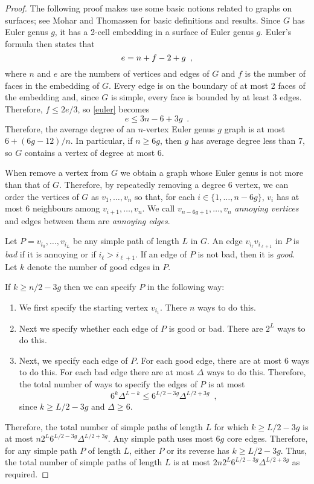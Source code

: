 \documentclass[lotsofwhite]{patmorin}
\begin{document}
\begin{proof}
   The following proof makes use some basic notions related to graphs
   on surfaces; see Mohar and Thomassen \cite{mohar.thomassen} for basic
   definitions and results.
   Since $G$ has Euler genus $g$, it has a 2-cell embedding in a surface
   of Euler genus $g$.  Euler's formula then states that 
   \begin{equation}
      e = n+f-2+g \enspace ,  \eqlabel{euler}
   \end{equation}
   where $n$ and $e$ are the numbers of vertices and edges of
   $G$ and $f$ is the number of faces in the embedding of $G$.  
   Every edge is on the boundary of at most 2 faces of the embedding
   and, since $G$ is simple, 
   every face is
   bounded by at least 3 edges.  Therefore, $f \le 2e/3$, so \eqref{euler}
   becomes
   \[
       e\le 3n-6+3g \enspace .
   \]
   Therefore, the average degree of an $n$-vertex Euler genus $g$ graph
   is at most $6+(6g-12)/n$.  In particular, if $n \ge 6g$, then $g$
   has average degree less than 7, so $G$ contains a vertex of degree
   at most $6$.
  
   When remove a vertex from $G$ we obtain a graph whose Euler genus is
   not more than that of $G$.  Therefore, by repeatedly removing a degree
   6 vertex, we can order the vertices of $G$ as $v_1,\ldots,v_n$ so that,
   for each $i\in\{1,\ldots,n-6g\}$, $v_i$ has at most 6 neighbours among
   $v_{i+1},\ldots,v_n$.  We call $v_{n-6g+1},\ldots,v_n$ \emph{annoying
   vertices} and edges between them are \emph{annoying edges}.

   Let $P=v_{i_0},\ldots,v_{i_L}$ be any simple path of length $L$
   in $G$.  An edge $v_{i_\ell}v_{i_{\ell+1}}$ in $P$ is \emph{bad}
   if it is annoying or if $i_{\ell}>i_{\ell+1}$. If an edge of $P$
   is not bad, then it is \emph{good}.  Let $k$ denote the number of
   good edges in $P$.

   If $k\ge n/2-3g$ then we can specify $P$ in the following way:
   \begin{enumerate}
     \item We first specify the starting vertex $v_{i_1}$.  There $n$
       ways to do this.
     \item Next we specify whether each edge of $P$ is good or bad.
       There are $2^L$ ways to do this.
     \item Next, we specify each edge of $P$.  For each good edge,
       there are at most 6 ways to do this. For each bad edge there are 
       at most $\Delta$ ways to do this.
      Therefore, the total number of ways to specify the edges of $P$ is at most
      \[   6^k\Delta^{L-k} \le 6^{L/2-3g}\Delta^{L/2+3g}  \enspace ,\]
      since $k\ge L/2-3g$ and $\Delta\ge 6$.
   \end{enumerate}
   Therefore, the total number of simple paths of length $L$ for which
   $k\ge L/2-3g$ is at most $n2^L6^{L/2-3g}\Delta^{L/2+3g}$.  Any simple
   path uses most $6g$ core edges.  Therefore, for any simple path
   $P$ of length $L$, either $P$ or its reverse has $k\ge L/2-3g$.
   Thus, the total number of simple paths of length $L$ is at most
   $2n2^L6^{L/2-3g}\Delta^{L/2+3g}$ as required.
\end{proof}
\end{document}
